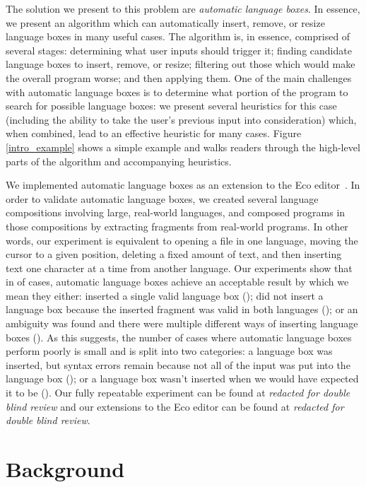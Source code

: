 \documentclass[sigplan,screen]{acmart}\settopmatter{printfolios=true,printccs=false,printacmref=false}
\begin{document}
The solution we present to this problem are \emph{automatic language boxes}. In
essence, we present an algorithm which can automatically insert, remove, or resize language
boxes in many useful cases. The algorithm is, in essence, comprised of several
stages: determining what user inputs should trigger it; finding candidate language
boxes to insert, remove, or resize; filtering out those which would make the
overall program worse; and then applying them. One of the main challenges with
automatic language boxes is to determine what portion of the program to search
for possible language boxes: we present several heuristics for this case
(including the ability to take the user's previous input into consideration)
which, when combined, lead to an effective heuristic for many cases. Figure
\ref{intro_example} shows a simple example and walks readers through the high-level
parts of the algorithm and accompanying heuristics.

We implemented automatic language boxes as an extension to the Eco
editor~\cite{diekmann14eco}. In order to validate automatic language boxes, we
created several language compositions involving large, real-world languages,
and composed programs in those compositions by extracting fragments from real-world programs.
In other words, our experiment is equivalent to opening a file
in one language, moving the cursor to a given position, deleting a fixed amount
of text, and then inserting text one character at a time from another language.
Our experiments show that in \validalloverall of cases, automatic language boxes achieve an
acceptable result by which we mean they either: inserted a single valid
language box (\breakdownallvalid); did not insert a language box because the
inserted fragment was valid in both languages (\breakdownallnovalid); or an ambiguity
was found and there were multiple different ways of inserting language boxes
(\breakdownallnomulti). As this suggests, the number of cases where automatic
language boxes perform poorly is small and is split into two categories: a
language box was inserted, but syntax errors remain because not all of the
input was put into the language box (\breakdownallinvalid); or a language box wasn't
inserted when we would have expected it to be (\breakdownallnoerror). Our fully
repeatable experiment can be found at \emph{redacted for double blind review}
and our extensions to the Eco editor can be found at \emph{redacted for double
blind review}.


\section{Background}
\label{sec_background}
\end{document}
